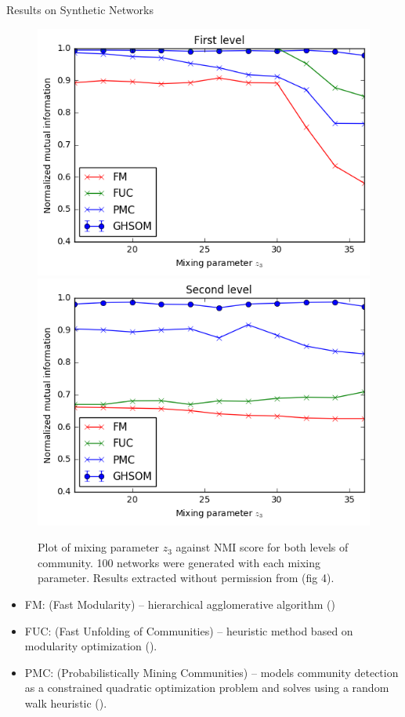 \documentclass{beamer}
\begin{document}
	\begin{frame}[allowframebreaks]{Results on Synthetic Networks}
	\begin{figure}
		\centering
		\includegraphics[scale=0.45]{first_level.png}
		\includegraphics[scale=0.45]{second_level.png}
		\caption{Plot of mixing parameter $z_3$ against NMI score for both levels of community. 100 networks were generated with each mixing parameter. Results extracted without permission from \protect			\cite{yang2013hierarchical} (fig 4).}
\label{synthetic_experiment}
\end{figure}
\begin{itemize}
\item FM: (Fast Modularity) -- hierarchical agglomerative algorithm
(\cite{clauset2004finding})
\item FUC: (Fast Unfolding of Communities) -- heuristic method based on modularity optimization 
(\cite{blondel2008fast}).
\item PMC: (Probabilistically Mining Communities) -- models community detection as a constrained quadratic optimization problem and solves using a random walk heuristic 
(\cite{yang2013hierarchical}). 
\end{itemize}
	\end{frame}
	
\end{document}
